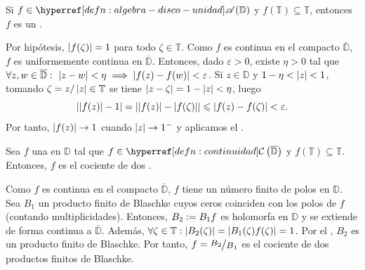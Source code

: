 \begin{cor}\label{cor:carac-prod-finito-blaschke-algebra-disco}
    Si $f \in \exhyperref[defn:algebra-disco-unidad]{algebra-disco-unidad}{\mathscr{A}(\mathbb{D})}$ y $f(\mathbb{T}) \subseteq \mathbb{T}$, entonces $f$ es un .
\end{cor}
\begin{dem}
    Por hipótesis, $\left|f(\zeta)\right| = 1$ para todo $\zeta \in \mathbb{T}$. Como $f$ es continua en el compacto $\overline{\mathbb{D}}$, $f$ es uniformemente continua en $\overline{\mathbb{D}}$. Entonces, dado $\varepsilon > 0$, existe $\eta > 0$ tal que $\forall z,w \in \overline{\mathbb{D}}:\ \left|z-w\right|<\eta \implies \left|f(z)-f(w)\right|<\varepsilon$.
    Si $z \in \mathbb{D}$ y $1-\eta < \left|z\right| < 1$, tomando $\zeta = z/\left|z\right| \in \mathbb{T}$ se tiene $\left|z-\zeta\right|=1-\left|z\right|<\eta$, luego
    \[
    \left|\left|f(z)\right|-1\right|=\left|\left|f(z)\right|-\left|f(\zeta)\right|\right|\leqslant \left|f(z)-f(\zeta)\right|<\varepsilon.
    \]
    Por tanto, $\left|f(z)\right| \to 1$ cuando $\left|z\right| \to 1^-$ y aplicamos el .\hfill\qedsymbol
\end{dem}

\begin{cor}\label{cor:carac-cociente-prod-finito-blaschke-algebra-disco-meromorfa}
    Sea $f$ una  en $\mathbb{D}$ tal que $f \in \exhyperref[defn:continuidad]{continuidad}{\mathcal{C}} \left(\bar{\mathbb{D}}\right)$ y $f(\mathbb{T}) \subseteq \mathbb{T}$. Entonces, $f$ es el cociente de dos .
\end{cor}
\begin{dem}
    Como $f$ es continua en el compacto $\bar{\mathbb{D}}$, $f$ tiene un número finito de polos en $\mathbb{D}$. Sea $B_1$ un producto finito de Blaschke cuyos ceros coinciden con los polos de $f$ (contando multiplicidades). Entonces, $B_2 \vcentcolon= B_1 f$ es holomorfa en $\mathbb{D}$ y se extiende de forma continua a $\bar{\mathbb{D}}$. Además, $\forall \zeta \in \mathbb{T} : \left|B_2(\zeta)\right| = \left|B_1(\zeta) f(\zeta)\right| = 1$. Por el , $B_2$ es un producto finito de Blaschke. Por tanto, $f = \sfrac{B_2}{B_1}$ es el cociente de dos productos finitos de Blaschke.\hfill\qedsymbol
\end{dem}

